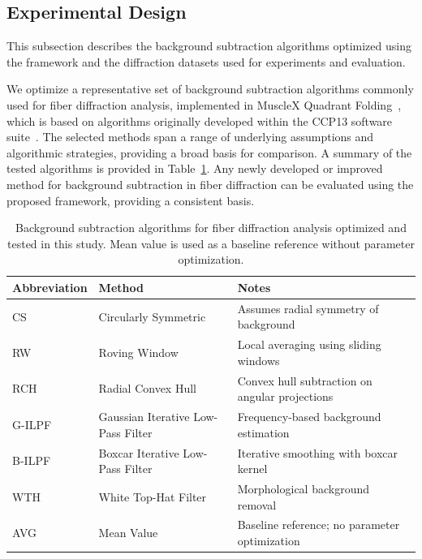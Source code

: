 \documentclass[iucr]{iucrjournals}
\begin{document}
\subsection{Experimental Design}

This subsection describes the background subtraction algorithms optimized using the framework and the diffraction datasets used for experiments and evaluation.

We optimize a representative set of background subtraction algorithms commonly used for fiber diffraction analysis, implemented in MuscleX Quadrant Folding~\cite{JiratrakanvongEtAl2024}, which is based on algorithms originally developed within the CCP13 software suite~\cite{HeEtAl2007}. The selected methods span a range of underlying assumptions and algorithmic strategies, providing a broad basis for comparison. A summary of the tested algorithms is provided in Table~\ref{tab:algorithms}. Any newly developed or improved method for background subtraction in fiber diffraction can be evaluated using the proposed framework, providing a consistent basis.

\begin{table}[t]
\caption{Background subtraction algorithms for fiber diffraction analysis optimized and tested in this study. Mean value is used as a baseline reference without parameter optimization.}
\label{tab:algorithms}
\centering
\small
\setlength{\tabcolsep}{6pt}
\renewcommand{\arraystretch}{1.1}
\begin{tabular}{@{}lll@{}}
\toprule
\textbf{Abbreviation} & \textbf{Method} & \textbf{Notes} \\
\midrule
CS & Circularly Symmetric & Assumes radial symmetry of background \\
RW & Roving Window & Local averaging using sliding windows \\
RCH & Radial Convex Hull & Convex hull subtraction on angular projections \\
G-ILPF & Gaussian Iterative Low-Pass Filter & Frequency-based background estimation \\
B-ILPF & Boxcar Iterative Low-Pass Filter & Iterative smoothing with boxcar kernel \\
WTH & White Top-Hat Filter & Morphological background removal \\
\midrule
AVG & Mean Value & Baseline reference; no parameter optimization \\
\bottomrule
\end{tabular}
\end{table}
\end{document}
